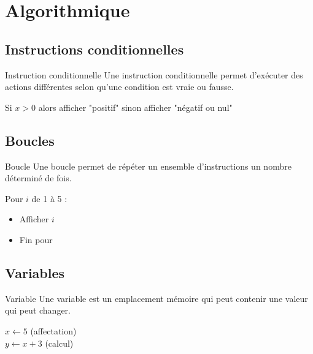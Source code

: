 \chapter{Algorithmique}

\section{Instructions conditionnelles}
\begin{definition}{Instruction conditionnelle}
Une instruction conditionnelle permet d'exécuter des actions différentes selon qu'une condition est vraie ou fausse.
\end{definition}

\begin{exemple}
Si $x > 0$ alors afficher "positif" sinon afficher "négatif ou nul"
\end{exemple}

\section{Boucles}
\begin{definition}{Boucle}
Une boucle permet de répéter un ensemble d'instructions un nombre déterminé de fois.
\end{definition}

\begin{exemple}
Pour $i$ de 1 à 5 :
\begin{itemize}
    \item Afficher $i$
    \item Fin pour
\end{itemize}
\end{exemple}

\section{Variables}
\begin{definition}{Variable}
Une variable est un emplacement mémoire qui peut contenir une valeur qui peut changer.
\end{definition}

\begin{exemple}
$x \leftarrow 5$ (affectation)\\
$y \leftarrow x + 3$ (calcul)
\end{exemple} 